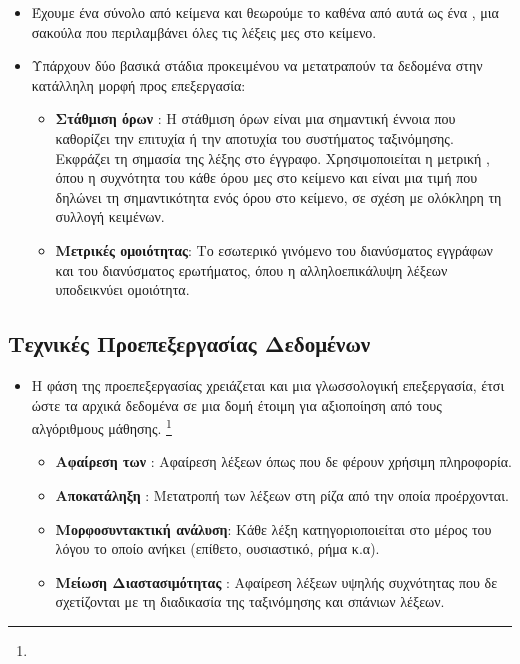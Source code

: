 \documentclass{beamer}
\begin{document}
\begin{frame}
\begin{itemize}
\item Έχουμε ένα σύνολο από κείμενα και θεωρούμε το καθένα από αυτά ως ένα {}, μια σακούλα που περιλαμβάνει όλες τις λέξεις μες στο κείμενο.
\item Υπάρχουν δύο βασικά στάδια προκειμένου να μετατραπούν τα δεδομένα στην κατάλληλη μορφή προς επεξεργασία: 
\vfill
\begin{itemize}
\item {\textbf{Στάθμιση όρων {}}}: Η στάθμιση όρων είναι μια σημαντική έννοια που καθορίζει την επιτυχία ή την αποτυχία του συστήματος ταξινόμησης. Εκφράζει τη σημασία της λέξης στο έγγραφο. Χρησιμοποιείται η μετρική {}, όπου {} η συχνότητα του κάθε όρου μες στο κείμενο και {} είναι μια τιμή που δηλώνει τη σημαντικότητα ενός όρου στο κείμενο, σε σχέση με ολόκληρη τη συλλογή κειμένων.
\vfill
\item {\textbf{Μετρικές ομοιότητας}}: Το εσωτερικό γινόμενο του διανύσματος εγγράφων και του διανύσματος ερωτήματος, όπου η αλληλοεπικάλυψη λέξεων υποδεικνύει ομοιότητα.
\end{itemize}
\vfill
\end{itemize}
\end{frame}

\subsection{Τεχνικές Προεπεξεργασίας Δεδομένων}

\begin{frame}
\begin{itemize}
\item Η φάση της προεπεξεργασίας χρειάζεται και μια γλωσσολογική επεξεργασία, έτσι ώστε τα αρχικά δεδομένα σε μια δομή έτοιμη για αξιοποίηση από τους αλγόριθμους μάθησης. \footnote{{}}
\vfill
\begin{itemize}
\item {\textbf{Αφαίρεση των {}}}: Αφαίρεση λέξεων όπως {} που δε φέρουν χρήσιμη πληροφορία.
\vfill
\item {\textbf{Αποκατάληξη {}}}: Μετατροπή των λέξεων στη ρίζα από την οποία προέρχονται.
\vfill
\item {\textbf{Μορφοσυντακτική ανάλυση{}}}: Κάθε λέξη κατηγοριοποιείται στο μέρος του λόγου το οποίο ανήκει (επίθετο, ουσιαστικό, ρήμα κ.α). 
\vfill
\item {\textbf{Μείωση Διαστασιμότητας {}}}: Αφαίρεση λέξεων υψηλής συχνότητας που δε σχετίζονται με τη διαδικασία της ταξινόμησης και σπάνιων λέξεων.
\end{itemize}
\end{itemize}
\end{frame}
\end{document}
